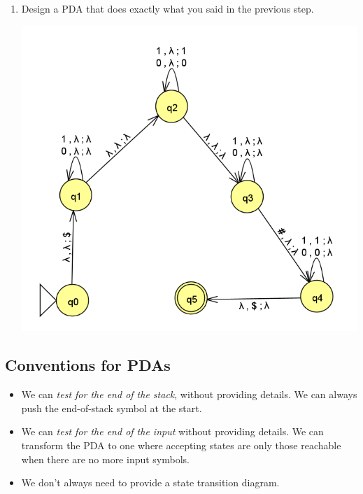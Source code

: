 \documentclass[letterpaper]{article}
\begin{document}
\begin{enumerate}
    \item Design a PDA that does exactly what you said in the previous step. 
    \begin{mdframed}[]
        \begin{center}
            \includegraphics[scale=0.5]{assets/pda_3.png}
        \end{center}
    \end{mdframed}
\end{enumerate}

\subsection{Conventions for PDAs}
\begin{itemize}
    \item We can \emph{test for the end of the stack}, without providing details. We can always push the end-of-stack symbol \code{\$} at the start. 
    \item We can \emph{test for the end of the input} without providing details. We can transform the PDA to one where accepting states are only those reachable when there are no more input symbols. 
    \item We don't always need to provide a state transition diagram.
\end{itemize}
\end{document}
